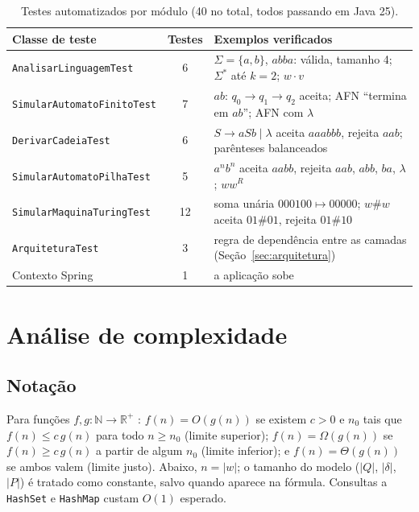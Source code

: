 \documentclass[12pt,a4paper]{article}
\newcommand{\cod}[1]{\texttt{#1}}
\newcommand{\lam}{\lambda}
\begin{document}
\begin{table}[htbp]
  \centering
  \caption{Testes automatizados por módulo (40 no total, todos passando em Java 25).}
  \label{tab:testes}
  \small
  \begin{tabularx}{\textwidth}{lcX}
    \toprule
    Classe de teste & Testes & Exemplos verificados \\
    \midrule
    \cod{AnalisarLinguagemTest}     & 6  & $\Sigma=\{a,b\}$, $abba$: válida, tamanho 4; $\Sigma^*$ até $k=2$; $w\cdot v$ \\
    \cod{SimularAutomatoFinitoTest} & 7  & $ab$: $q_0 \to q_1 \to q_2$ aceita; AFN ``termina em $ab$''; AFN com $\lam$ \\
    \cod{DerivarCadeiaTest}         & 6  & $S \to aSb \mid \lam$ aceita $aaabbb$, rejeita $aab$; parênteses balanceados \\
    \cod{SimularAutomatoPilhaTest}  & 5  & $a^nb^n$ aceita $aabb$, rejeita $aab$, $abb$, $ba$, $\lam$; $ww^R$ \\
    \cod{SimularMaquinaTuringTest}  & 12 & soma unária $000100 \mapsto 00000$; $w\#w$ aceita $01\#01$, rejeita $01\#10$ \\
    \cod{ArquiteturaTest}           & 3  & regra de dependência entre as camadas (Seção~\ref{sec:arquitetura}) \\
    Contexto Spring                 & 1  & a aplicação sobe \\
    \bottomrule
  \end{tabularx}
\end{table}

\section{Análise de complexidade}

\subsection{Notação}

Para funções $f, g: \mathbb{N} \to \mathbb{R}^+$ \cite{cormen}:
$f(n) = O(g(n))$ se existem $c > 0$ e $n_0$ tais que $f(n) \le c\,g(n)$ para
todo $n \ge n_0$ (limite superior); $f(n) = \Omega(g(n))$ se
$f(n) \ge c\,g(n)$ a partir de algum $n_0$ (limite inferior); e
$f(n) = \Theta(g(n))$ se ambos valem (limite justo). Abaixo, $n = |w|$; o
tamanho do modelo ($|Q|$, $|\delta|$, $|P|$) é tratado como constante, salvo
quando aparece na fórmula. Consultas a \cod{HashSet} e \cod{HashMap} custam
$O(1)$ esperado.
\end{document}
